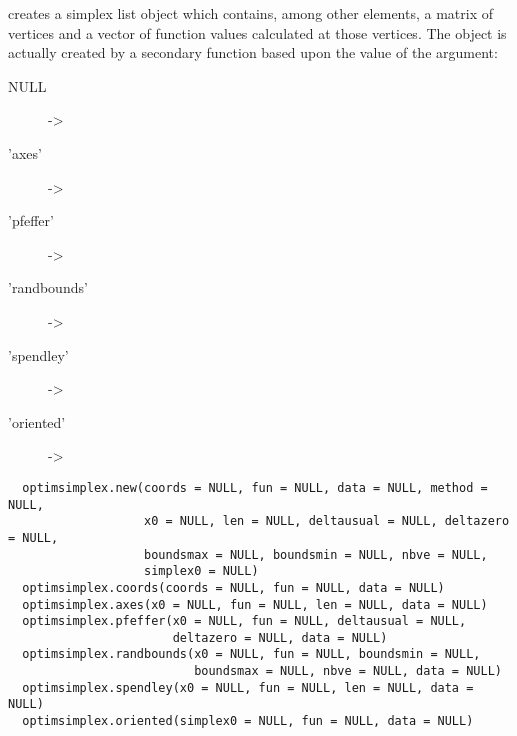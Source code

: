 %
\begin{Description}\relax
{} creates a simplex list object which contains, among
other elements, a matrix of vertices and a vector of function values
calculated at those vertices. The object is actually created by a secondary
function based upon the value of the  argument:\begin{description}

\item[NULL] -> 
\item['axes'] -> 
\item['pfeffer'] -> 
\item['randbounds'] ->  
\item['spendley'] ->  
\item['oriented'] -> 

\end{description}

\end{Description}
%
\begin{Usage}
\begin{verbatim}
  optimsimplex.new(coords = NULL, fun = NULL, data = NULL, method = NULL,
                   x0 = NULL, len = NULL, deltausual = NULL, deltazero = NULL,
                   boundsmax = NULL, boundsmin = NULL, nbve = NULL,
                   simplex0 = NULL)
  optimsimplex.coords(coords = NULL, fun = NULL, data = NULL)
  optimsimplex.axes(x0 = NULL, fun = NULL, len = NULL, data = NULL)
  optimsimplex.pfeffer(x0 = NULL, fun = NULL, deltausual = NULL,
                       deltazero = NULL, data = NULL)
  optimsimplex.randbounds(x0 = NULL, fun = NULL, boundsmin = NULL,
                          boundsmax = NULL, nbve = NULL, data = NULL)
  optimsimplex.spendley(x0 = NULL, fun = NULL, len = NULL, data = NULL)
  optimsimplex.oriented(simplex0 = NULL, fun = NULL, data = NULL)
\end{verbatim}
\end{Usage}
